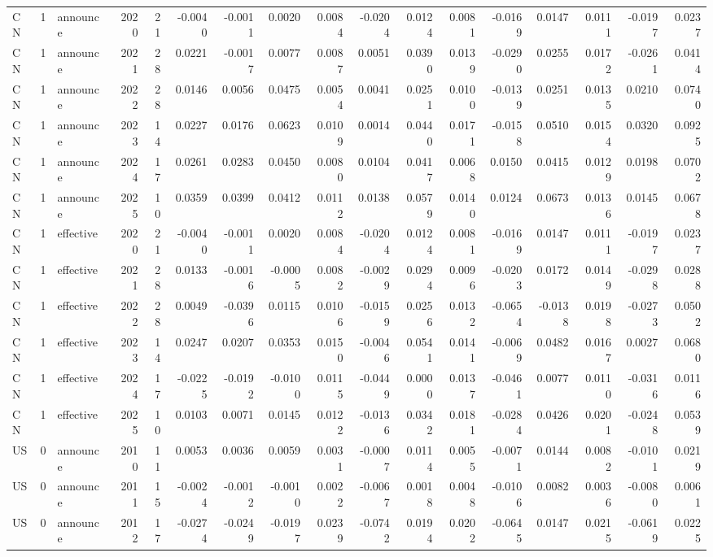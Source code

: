 \begin{tabular}{lrlrrrrrrrrrrrrrr}
CN & 1 & announce & 2020 & 21 & -0.0040 & -0.0011 & 0.0020 & 0.0084 & -0.0204 & 0.0124 & 0.0081 & -0.0169 & 0.0147 & 0.0111 & -0.0197 & 0.0237 \\
CN & 1 & announce & 2021 & 28 & 0.0221 & -0.0017 & 0.0077 & 0.0087 & 0.0051 & 0.0390 & 0.0139 & -0.0290 & 0.0255 & 0.0172 & -0.0261 & 0.0414 \\
CN & 1 & announce & 2022 & 28 & 0.0146 & 0.0056 & 0.0475 & 0.0054 & 0.0041 & 0.0251 & 0.0100 & -0.0139 & 0.0251 & 0.0135 & 0.0210 & 0.0740 \\
CN & 1 & announce & 2023 & 14 & 0.0227 & 0.0176 & 0.0623 & 0.0109 & 0.0014 & 0.0440 & 0.0171 & -0.0158 & 0.0510 & 0.0154 & 0.0320 & 0.0925 \\
CN & 1 & announce & 2024 & 17 & 0.0261 & 0.0283 & 0.0450 & 0.0080 & 0.0104 & 0.0417 & 0.0068 & 0.0150 & 0.0415 & 0.0129 & 0.0198 & 0.0702 \\
CN & 1 & announce & 2025 & 10 & 0.0359 & 0.0399 & 0.0412 & 0.0112 & 0.0138 & 0.0579 & 0.0140 & 0.0124 & 0.0673 & 0.0136 & 0.0145 & 0.0678 \\
CN & 1 & effective & 2020 & 21 & -0.0040 & -0.0011 & 0.0020 & 0.0084 & -0.0204 & 0.0124 & 0.0081 & -0.0169 & 0.0147 & 0.0111 & -0.0197 & 0.0237 \\
CN & 1 & effective & 2021 & 28 & 0.0133 & -0.0016 & -0.0005 & 0.0082 & -0.0029 & 0.0294 & 0.0096 & -0.0203 & 0.0172 & 0.0149 & -0.0298 & 0.0288 \\
CN & 1 & effective & 2022 & 28 & 0.0049 & -0.0396 & 0.0115 & 0.0106 & -0.0159 & 0.0256 & 0.0132 & -0.0654 & -0.0138 & 0.0198 & -0.0273 & 0.0502 \\
CN & 1 & effective & 2023 & 14 & 0.0247 & 0.0207 & 0.0353 & 0.0150 & -0.0046 & 0.0541 & 0.0141 & -0.0069 & 0.0482 & 0.0167 & 0.0027 & 0.0680 \\
CN & 1 & effective & 2024 & 17 & -0.0225 & -0.0192 & -0.0100 & 0.0115 & -0.0449 & 0.0000 & 0.0137 & -0.0461 & 0.0077 & 0.0110 & -0.0316 & 0.0116 \\
CN & 1 & effective & 2025 & 10 & 0.0103 & 0.0071 & 0.0145 & 0.0122 & -0.0136 & 0.0342 & 0.0181 & -0.0284 & 0.0426 & 0.0201 & -0.0248 & 0.0539 \\
US & 0 & announce & 2010 & 11 & 0.0053 & 0.0036 & 0.0059 & 0.0031 & -0.0007 & 0.0114 & 0.0055 & -0.0071 & 0.0144 & 0.0082 & -0.0101 & 0.0219 \\
US & 0 & announce & 2011 & 15 & -0.0024 & -0.0012 & -0.0010 & 0.0022 & -0.0067 & 0.0018 & 0.0048 & -0.0106 & 0.0082 & 0.0036 & -0.0080 & 0.0061 \\
US & 0 & announce & 2012 & 17 & -0.0274 & -0.0249 & -0.0197 & 0.0239 & -0.0742 & 0.0194 & 0.0202 & -0.0645 & 0.0147 & 0.0215 & -0.0619 & 0.0225 \\

\end{tabular}

